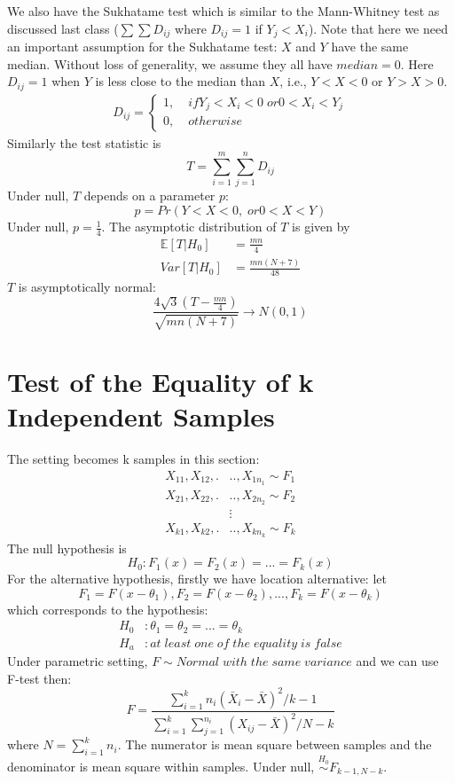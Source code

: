 \documentclass[twoside]{article}
\begin{document}
	We also have the Sukhatame test which is similar to the Mann-Whitney test as discussed last class ($\sum \sum D_{ij}$ where $D_{ij}=1$ if $Y_j < X_i$). Note that here we need an important assumption for the Sukhatame test: $X$ and $Y$ have the same median. Without loss of generality, we assume they all have $median=0$. Here $D_{ij}=1$ when $Y$ is less close to the median than $X$, i.e., $Y<X<0$ or $Y>X>0$. 
	\begin{align*}
		D_{ij} = \begin{cases}
			1, \; &if Y_j < X_i <0 \; or 0 < X_i < Y_j \\
			0, \; &otherwise
		\end{cases}
	\end{align*}
	Similarly the test statistic is 
	$$
	T = \sum_{i=1}^{m} \sum_{j=1}^{n} D_{ij}
	$$
	Under null, $T$ depends on a parameter $p$:
	$$
	p = Pr \left( Y<X<0, \; or 0<X<Y \right)
	$$
	Under null, $p = \frac{1}{4}$. The asymptotic distribution of $T$ is given by
	\begin{align*}
		\mathbb{E} \left[ T | H_0 \right] &= \frac{mn}{4} \\
		Var \left[ T | H_0 \right] &= \frac{mn(N+7)}{48}
	\end{align*}
	$T$ is asymptotically normal:
	$$
	\frac{4 \sqrt{3} \left( T - \frac{mn}{4} \right)}{\sqrt{mn(N+7)}} \rightarrow N \left(0, 1 \right)
	$$

	\section{Test of the Equality of k Independent Samples}
	The setting becomes k samples in this section: 
	\begin{align*}
		X_{11}, X_{12}, .&.., X_{1 n_1} \sim F_1 \\
		X_{21}, X_{22}, .&.., X_{2 n_2} \sim F_2 \\
		&\vdots \\
		X_{k1}, X_{k2}, .&.., X_{k n_k} \sim F_k
	\end{align*}
	The null hypothesis is
	$$
	H_0: F_1(x) = F_2(x) = ... = F_k(x)
	$$
	For the alternative hypothesis, firstly we have location alternative: let
	$$
	F_1 = F(x - \theta_1), F_2 = F(x - \theta_2), ..., F_k = F(x - \theta_k)
	$$
	which corresponds to the hypothesis: 
	\begin{align*}
		H_0 &: \theta_1 = \theta_2 = ... = \theta_k \\
		H_a &: at \; least \; one \; of \; the \; equality \; is \; false
	\end{align*}
	Under parametric setting, $F \sim Normal \; with \; the \; same \; variance$ and we can use F-test then: 
	$$
	F = \frac{\sum_{i=1}^{k} n_i \left( \bar{X}_i - \bar{X} \right)^2/k-1}{\sum_{i=1}^{k} \sum_{j=1}^{n_i} \left( X_{ij} - \bar{X} \right)^2/N-k}
	$$
	where $N = \sum_{i=1}^{k} n_i$. The numerator is mean square between samples and the denominator is mean square within samples. Under null, $\stackrel{H_0}{\sim} F_{k-1, N-k}$. 
	
\end{document}
